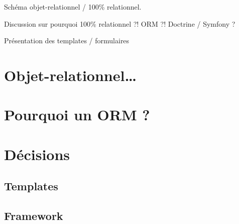 Schéma objet-relationnel / 100\% relationnel.

Discussion sur pourquoi 100\% relationnel ?! ORM ?! Doctrine / Symfony ?

Présentation des templates / formulaires

\section{Objet-relationnel\ldots}

\section{Pourquoi un ORM ?}

\section{Décisions}
\subsection{Templates}
\subsection{Framework}